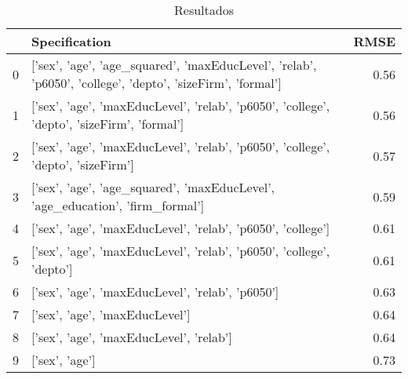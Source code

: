 \begin{table}
\caption{Resultados}
\begin{tabular}{llr}
\toprule
 & Specification & RMSE \\
\midrule
0 & ['sex', 'age', 'age_squared', 'maxEducLevel', 'relab', 'p6050', 'college', 'depto', 'sizeFirm', 'formal'] & 0.56 \\
1 & ['sex', 'age', 'maxEducLevel', 'relab', 'p6050', 'college', 'depto', 'sizeFirm', 'formal'] & 0.56 \\
2 & ['sex', 'age', 'maxEducLevel', 'relab', 'p6050', 'college', 'depto', 'sizeFirm'] & 0.57 \\
3 & ['sex', 'age', 'age_squared', 'maxEducLevel', 'age_education', 'firm_formal'] & 0.59 \\
4 & ['sex', 'age', 'maxEducLevel', 'relab', 'p6050', 'college'] & 0.61 \\
5 & ['sex', 'age', 'maxEducLevel', 'relab', 'p6050', 'college', 'depto'] & 0.61 \\
6 & ['sex', 'age', 'maxEducLevel', 'relab', 'p6050'] & 0.63 \\
7 & ['sex', 'age', 'maxEducLevel'] & 0.64 \\
8 & ['sex', 'age', 'maxEducLevel', 'relab'] & 0.64 \\
9 & ['sex', 'age'] & 0.73 \\
\bottomrule
\end{tabular}
\end{table}
